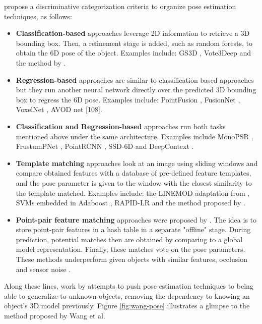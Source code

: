 \textcite{sahin2020review} propose a discriminative categorization criteria to organize pose estimation techniques, as follows:
\begin{itemize}
    \item \textbf{Classification-based} approaches leverage 2D information to retrieve a 3D bounding box. Then, a refinement stage is added, such as random forests, to obtain the 6D pose of the object. Examples include: GS3D \cite{li2019gs3d}, Vote3Deep \cite{engelcke2017vote3deep} and the method by \textcite{michel2017global}.
    \item \textbf{Regression-based} approaches are similar to classification based approaches but they run another neural network directly over the predicted 3D bounding box to regress the 6D pose. Examples include: PointFusion \cite{xu2018pointfusion}, FusionNet \cite{hegde2016fusionnet}, VoxelNet \cite{zhou2018voxelnet}, AVOD net [108].
    \item \textbf{Classification and Regression-based} approaches run both tasks mentioned above under the same architecture. Examples include MonoPSR \cite{Ku_2019}, FrustumPNet \cite{qi2018frustum}, PointRCNN \cite{shi2019pointrcnn}, SSD-6D \cite{kehl2017ssd} and DeepContext \cite{zhang2017deepcontext}.
    \item \textbf{Template matching} approaches look at an image using sliding windows and compare obtained features with a database of pre-defined feature templates, and the pose parameter is given to the window with the closest similarity to the template matched. Examples include: the LINEMOD adaptation from \textcite{hinterstoisser2012model}, SVMs embedded in Adaboost \cite{rios2013discriminatively}, RAPID-LR \cite{Munoz_2016} and the method proposed by \textcite{Ku_2018}.
    \item \textbf{Point-pair feature matching} approaches were proposed by \textcite{drost2010model}. The idea is to store point-pair features in a hash table in a separate "offline" stage. During prediction, potential matches then are obtained by comparing to a global model representation. Finally, these matches vote on the pose parameters. These methods underperform given objects with similar features, occlusion and sensor noise \cite{Mohamad_2014}. 
    \end{itemize}


    
Along these lines, work by \textcite{Wang_2019} attempts to push pose estimation techniques to being able to generalize to unknown objects, removing the dependency to knowing an object's 3D model previously. Figure \ref{fig:wang-pose} illustrates a glimpse to the method proposed by Wang et al.


